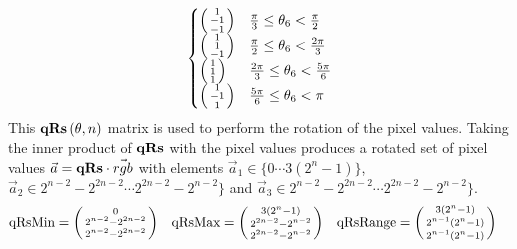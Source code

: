 \begin{gather*}
\begin{aligned}
\begin{cases}
\left( \begin{smallmatrix}  1 \\  -1 \\ -1\\ \end{smallmatrix} \right) & \frac{  \pi }{3} \leq  \theta_6  < \frac{   \pi }{2} \\
\left( \begin{smallmatrix}  1 \\    1 \\ -1\\ \end{smallmatrix} \right) & \frac{  \pi }{2} \leq  \theta_6  < \frac{2 \pi }{3} \\
\left( \begin{smallmatrix}  1 \\    1 \\   1\\ \end{smallmatrix} \right) & \frac{2\pi }{3} \leq  \theta_6  < \frac{5 \pi }{6} \\
\left( \begin{smallmatrix}  1 \\  -1 \\   1\\ \end{smallmatrix} \right) & \frac{5\pi }{6} \leq  \theta_6  <             \pi  \\
\end{cases} 
\end{aligned} \\
\end{gather*}
This $\qRs[\theta, n]$ matrix is used to perform the rotation of the pixel values. Taking the inner product of $\qRs$ with the pixel values produces 
a rotated set of pixel values $\vec{a} = \qRs \cdot \vec{rgb}$ with elements $ \vec{a}_1 \in \{0 \cdots 3 (2^n - 1)\}$,  $ \vec{a}_2 \in 2^{n-2}-2^{2 n-2} \cdots 2^{2 n-2}-2^{n-2}  \}$ and $ \vec{a}_3 \in 2^{n-2}-2^{2 n-2}  \cdots 2^{2 n-2}-2^{n-2}  \}$. 
\begin{align*}
\text{qRsMin}     &= \left( \begin{smallmatrix} 0                \\  2^{n-2}-2^{2 n-2}                  \\ 2^{n-2}-2^{2 n-2}               \\ \end{smallmatrix} \right) & 
\text{qRsMax}    &= \left( \begin{smallmatrix} 3 (2^n - 1) \\  2^{2 n-2}-2^{n-2}                  \\  2^{2 n-2}-2^{n-2}              \\ \end{smallmatrix} \right) & 
\text{qRsRange} &= \left( \begin{smallmatrix} 3 (2^n - 1) \\  2^{n-1} \left(2^n-1\right)      \\  2^{n-1} \left(2^n-1\right)  \\ \end{smallmatrix} \right) 
\end{align*}
